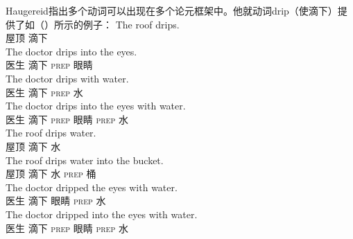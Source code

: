 \begin{exe}
\begin{xlist}[iv.]
\begin{exe}
\begin{xlist}[iv.]
\noindent
Haugereid指出多个动词可以出现在多个论元框架中。他就动词drip（使滴下）提供了如（）所示的例子：
\eal
\settowidth{}
\ex
\gll The roof drips.                    \\
      屋顶 滴下\\
\ex
\gll The doctor drips into the eyes.    \\
      医生 滴下 \textsc{prep}  眼睛\\
\ex
\gll The doctor drips with water.       \\
      医生 滴下 \textsc{prep} 水\\
\ex
\gll The doctor drips into the eyes with water. \\
      医生 滴下 \textsc{prep}  眼睛 \textsc{prep} 水\\
\ex
\gll The roof drips water.                      \\
      屋顶 滴下 水\\
\ex
\gll The roof drips water into the bucket.      \\
      屋顶 滴下 水 \textsc{prep}  桶\\
\ex
\gll The doctor dripped the eyes with water.    \\
      医生 滴下  眼睛 \textsc{prep} 水\\
\ex
\gll The doctor dripped into the eyes with water. \\
      医生 滴下 \textsc{prep}  眼睛 \textsc{prep} 水\\

\end{xlist}
\end{exe}
\end{xlist}
\end{exe}
